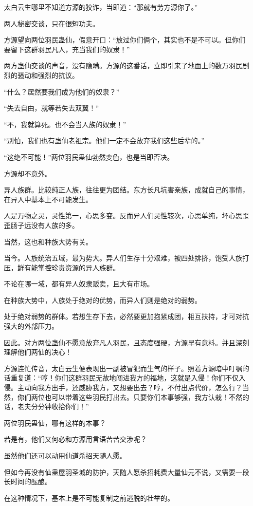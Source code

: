\begin{this_body}
太白云生哪里不知道方源的狡诈，当即道：“那就有劳方源你了。”

两人秘密交谈，只在很短功夫。

方源望向两位羽民蛊仙，假意开口：“放过你们俩个，其实也不是不可以。但你们要留下这群羽民凡人，充当我们的奴隶！”

两方蛊仙交谈的声音，没有隐瞒。方源的这番话，立即引来了地面上的数万羽民剧烈的骚动和强烈的抗议。

“什么？居然要我们成为他们的奴隶？”

“失去自由，就等若失去双翼！”

“不，我就算死。也不会当人族的奴隶！”

“别怕，我们也有蛊仙老祖宗。他们一定不会放弃我们这些后辈的。”

“这绝不可能！”两位羽民蛊仙勃然变色，也是当即否决。

方源却不意外。

异人族群。比较纯正人族，往往更为团结。东方长凡坑害亲族，成就自己的事情，在异人中基本上不可能发生。

人是万物之灵，灵性第一，心思多变。反而异人们灵性较次，心思单纯，坏心思歪歪肠子远没有人族的多。

当然，这也和种族大势有关。

当今。人族统治五域，最为势大。异人们生存十分艰难，被四处排挤，饱受人族打压，鲜有能掌控珍贵资源的异人族群。

不论在哪一域，都有异人奴隶贩卖，且大有市场。

在种族大势中，人族处于绝对的优势，而异人们则是绝对的弱势。

处于绝对弱势的群体。若想生存下去，必然要更加抱紧成团，相互扶持，才可对抗强大的外部压力。

因此。对方两位蛊仙不愿意放弃凡人羽民，且态度强硬，方源早有意料。并且深刻理解他们两仙的决心！

方源连忙传音，太白云生便表现出一副被冒犯而生气的样子。照着方源暗中叮嘱的话重复道：“哼！你们这群羽民无故地闯进我方的福地，这就是入侵！你们不仅入侵。主动向我方出手，还威胁我方，又想要出去？哼，不付出点代价，怎么行？当然，你们两位也可以带着这些羽民打出去。只要你们本事够强，我方认栽！不然的话，老夫分分钟收拾你们！”

两位羽民蛊仙，哪有这样的本事？

若是有，他们又何必和方源用言语苦苦交涉呢？

虽然他们还可以动用仙道杀招天随人愿。

但如今再没有仙蛊屋羽圣城的防护，天随人愿杀招耗费大量仙元不说，又需要一段长时间的酝酿。

在这种情况下，基本上是不可能复制之前逃脱的壮举的。


\end{this_body}
